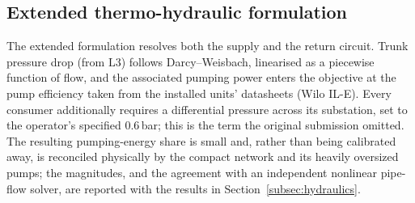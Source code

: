 \documentclass[a4paper,fleqn]{cas-sc}
\newcommand{\Lthree}{\ensuremath{\mathrm{L3}}}  %
\newcommand{\new}[1]{\textcolor[HTML]{1A5FB4}{#1}}   %
\newcommand{\new}[1]{#1}
\begin{document}
\new{}

\subsection{Extended thermo-hydraulic formulation}\label{sec:extended}
\new{}
The extended formulation resolves both the supply and the return circuit. Trunk pressure drop
(from $\Lthree$) follows Darcy--Weisbach, linearised as a piecewise function of flow, and the
associated pumping power enters the objective at the pump efficiency taken from the installed
units' datasheets (Wilo IL-E). Every consumer additionally requires a differential pressure
across its substation, set to the operator's specified $0.6$\,bar; this is the term the
original submission omitted. The resulting pumping-energy share is small and, rather than being
calibrated away, is reconciled physically by the compact network and its heavily oversized pumps;
the magnitudes, and the agreement with an independent nonlinear pipe-flow solver, are reported
with the results in Section~\ref{subsec:hydraulics}.
\end{document}
